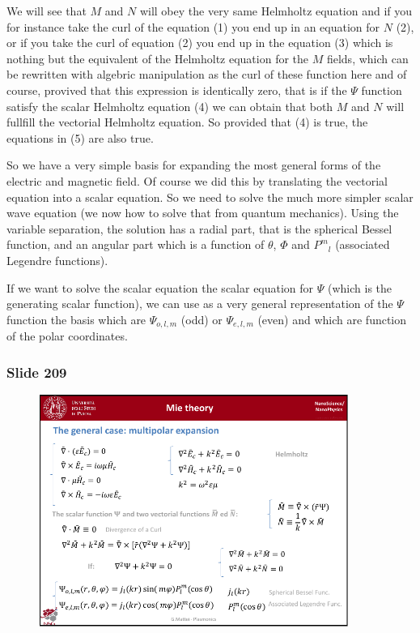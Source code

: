 \documentclass[../main/main.tex]{subfiles}
\begin{document}
We will see that \( M \) and \( N \) will obey the very same Helmholtz equation and if you for instance take the curl of the equation (1) you end up in an equation for \( N \) (2), or if you take the curl of equation (2) you end up in the equation (3) which is nothing but the equivalent of the Helmholtz equation for the \( M \) fields, which can be rewritten with algebric manipulation as the curl of these function here and of course, provived that this expression is identically zero, that is if the \( \Psi  \) function satisfy the scalar Helmholtz equation (4) we can obtain that both \( M \) and \( N \) will fullfill the vectorial Helmholtz equation.
So provided that (4) is true, the equations in (5) are also true.

So we have a very simple basis for expanding the most general forms of the electric and magnetic field.
Of course we did this by translating the vectorial equation into a scalar equation. So we need to solve the much more simpler scalar wave equation (we now how to solve that from quantum mechanics).
Using the variable separation, the solution has a radial part, that is the spherical Bessel function, and an angular part which is a function of  $\theta$, $\Phi$ and ${P^m}_l$ (associated Legendre functions).


If we want to solve the scalar equation the scalar equation for \( \Psi  \) (which is the generating scalar function), we can use as a very general representation of the \( \Psi  \) function the basis which are \( \Psi _{o,l,m} \) (odd) or \( \Psi _{e,l,m} \) (even) and which are function of the polar coordinates.


\newpage

\subsubsection{Slide 209}

\begin{figure}[h!]
\centering
\includegraphics[page=2,width=0.9\textwidth]{../lessons/pdf_file/13_lesson.pdf}
\end{figure}
\end{document}
